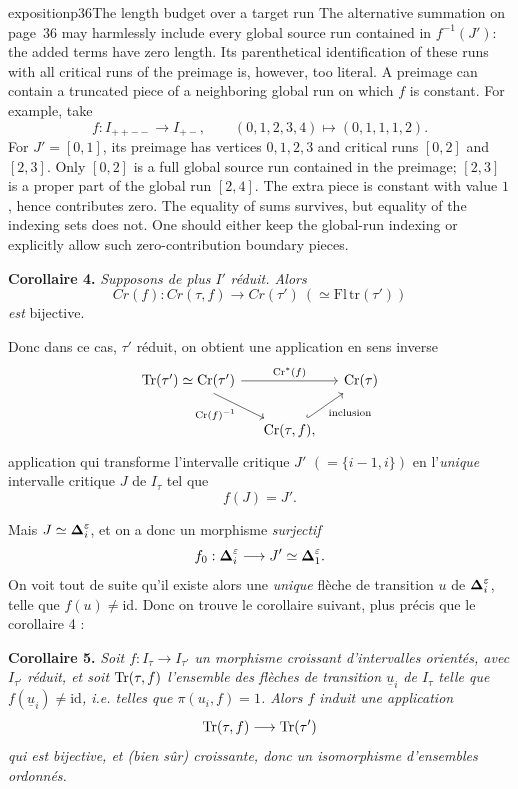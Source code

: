 \begin{dcomment}{exposition}{p36}{The length budget over a target run}
The alternative summation on page~36 may harmlessly include every global source run contained in $f^{-1}(J')$: the added terms have zero length. Its parenthetical identification of these runs with all critical runs of the preimage is, however, too literal. A preimage can contain a truncated piece of a neighboring global run on which $f$ is constant. For example, take
\[
 f:I_{++--}\longrightarrow I_{+-},\qquad
 (0,1,2,3,4)\longmapsto(0,1,1,1,2).
\]
For $J'=[0,1]$, its preimage has vertices $0,1,2,3$ and critical runs $[0,2]$ and $[2,3]$. Only $[0,2]$ is a full global source run contained in the preimage; $[2,3]$ is a proper part of the global run $[2,4]$. The extra piece is constant with value $1$, hence contributes zero. The equality of sums survives, but equality of the indexing sets does not. One should either keep the global-run indexing or explicitly allow such zero-contribution boundary pieces.
\end{dcomment}


\textbf{Corollaire 4.} \textit{Supposons de plus $I'$} \textit{réduit. Alors}
\[
\mathit{Cr}(f) : \mathit{Cr}(\tau, f) \longrightarrow \mathit{Cr}(\tau')\ (\simeq \mathrm{Fl}\,\mathrm{tr}(\tau'))
\]
\textit{est} bijective.

Donc dans ce cas, $\tau'$ réduit, on obtient une application en sens inverse
\[
\begin{tikzcd}[column sep=small]
\Tr(\tau') \simeq \Cr(\tau') \arrow[rr, "\Cr^*(f)"] \arrow[dr, "\Cr(f)^{-1}"'] & & \Cr(\tau) \\
 & \Cr(\tau, f), \arrow[ur, hook, "\text{inclusion}"'] &
\end{tikzcd}
\]
application qui transforme l'intervalle critique $J'$ $(= \{i - 1, i\})$ en l'\textit{unique} intervalle critique $J$ de $I_\tau$ tel que
\[
f(J) = J'.
\]

Mais $J \simeq \boldsymbol{\Delta}_i^{\varepsilon}$, et on a donc un morphisme \textit{surjectif}
\[
f_0 : \boldsymbol{\Delta}_i^{\varepsilon} \longrightarrow J' \simeq \boldsymbol{\Delta}_1^{\varepsilon}.
\]
On voit tout de suite qu'il existe alors une \textit{unique} flèche de transition $u$ de $\boldsymbol{\Delta}_i^{\varepsilon}$, telle que $f(u) \neq \mathrm{id}$. Donc on trouve le corollaire suivant, plus précis que le corollaire 4 :

\textbf{Corollaire 5.} \textit{Soit $f : I_\tau \longrightarrow I_{\tau'}$ un morphisme croissant d'intervalles orientés, avec $I_{\tau'}$ réduit, et soit $\mathrm{Tr}(\tau, f)$ l'ensemble des flèches de transition $\underline{u}_i$ de $I_\tau$ telle que $f(\underline{u}_i) \neq \mathrm{id}$, i.e. telles que $\pi(u_i, f) = 1$. Alors $f$ induit une application} %
\[
\mathrm{Tr}(\tau, f) \longrightarrow \mathrm{Tr}(\tau')
\]
\textit{qui est bijective, et (bien sûr) croissante, donc un isomorphisme d'ensembles ordonnés.}

